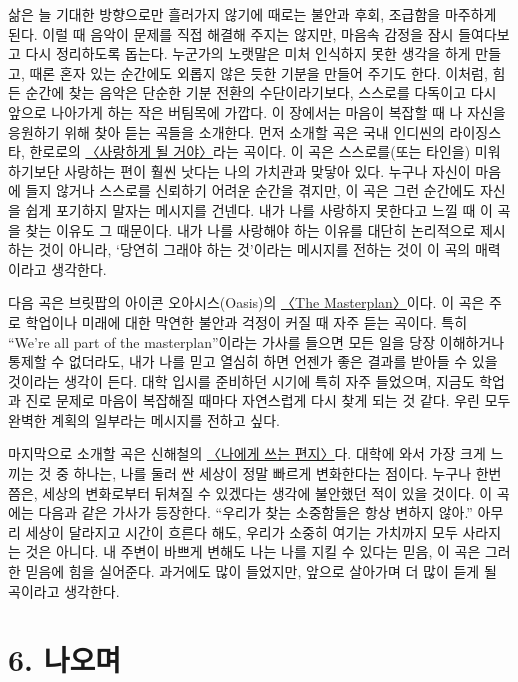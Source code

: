 \documentclass{article}
\let\plainhref\href
\renewcommand{\href}[2]{\plainhref{#1}{\underline{#2}}}
\begin{document}
\indent 삶은 늘 기대한 방향으로만 흘러가지 않기에 때로는 불안과 후회, 조급함을 마주하게 된다. 이럴 때 음악이 문제를 직접 해결해 주지는 않지만, 마음속 감정을 잠시 들여다보고 다시 정리하도록 돕는다. 누군가의 노랫말은 미처 인식하지 못한 생각을 하게 만들고, 때론 혼자 있는 순간에도 외롭지 않은 듯한 기분을 만들어 주기도 한다. 이처럼, 힘든 순간에 찾는 음악은 단순한 기분 전환의 수단이라기보다, 스스로를 다독이고 다시 앞으로 나아가게 하는 작은 버팀목에 가깝다. 이 장에서는 마음이 복잡할 때 나 자신을 응원하기 위해 찾아 듣는 곡들을 소개한다. 먼저 소개할 곡은 국내 인디씬의 라이징스타, 한로로의 \href{https://youtu.be/h0KIWaUEIgQ?si=5VR-VvL-AEm-ooM6}{〈사랑하게 될 거야〉}라는 곡이다. 이 곡은 스스로를(또는 타인을) 미워하기보단 사랑하는 편이 훨씬 낫다는 나의 가치관과 맞닿아 있다. 누구나 자신이 마음에 들지 않거나 스스로를 신뢰하기 어려운 순간을 겪지만, 이 곡은 그런 순간에도 자신을 쉽게 포기하지 말자는 메시지를 건넨다. 내가 나를 사랑하지 못한다고 느낄 때 이 곡을 찾는 이유도 그 때문이다. 내가 나를 사랑해야 하는 이유를 대단히 논리적으로 제시하는 것이 아니라, `당연히 그래야 하는 것'이라는 메시지를 전하는 것이 이 곡의 매력이라고 생각한다. 
\medskip

 \indent 다음 곡은 브릿팝의 아이콘 오아시스(Oasis)의 \href{https://youtu.be/dPPi2D6GK7A?si=uDUmr9USeEactqyv}{〈The Masterplan〉}이다. 이 곡은 주로 학업이나 미래에 대한 막연한 불안과 걱정이 커질 때 자주 듣는 곡이다. 특히 ``We're all part of the masterplan''이라는 가사를 들으면 모든 일을 당장 이해하거나 통제할 수 없더라도, 내가 나를 믿고 열심히 하면 언젠가 좋은 결과를 받아들 수 있을 것이라는 생각이 든다. 대학 입시를 준비하던 시기에 특히 자주 들었으며, 지금도 학업과 진로 문제로 마음이 복잡해질 때마다 자연스럽게 다시 찾게 되는 것 같다. 우린 모두 완벽한 계획의 일부라는 메시지를 전하고 싶다. 
\medskip

 \indent 마지막으로 소개할 곡은 신해철의 \href{https://youtu.be/HRlwPwqC-Y0?si=w3gsKWYJDUgvj0xK}{〈나에게 쓰는 편지〉}다. 대학에 와서 가장 크게 느끼는 것 중 하나는, 나를 둘러 싼 세상이 정말 빠르게 변화한다는 점이다. 누구나 한번쯤은, 세상의 변화로부터 뒤쳐질 수 있겠다는 생각에 불안했던 적이 있을 것이다. 이 곡에는 다음과 같은 가사가 등장한다. ``우리가 찾는 소중함들은 항상 변하지 않아.'' 아무리 세상이 달라지고 시간이 흐른다 해도, 우리가 소중히 여기는 가치까지 모두 사라지는 것은 아니다. 내 주변이 바쁘게 변해도 나는 나를 지킬 수 있다는 믿음, 이 곡은 그러한 믿음에 힘을 실어준다. 과거에도 많이 들었지만, 앞으로 살아가며 더 많이 듣게 될 곡이라고 생각한다. 

\section{6. 나오며}
\end{document}
